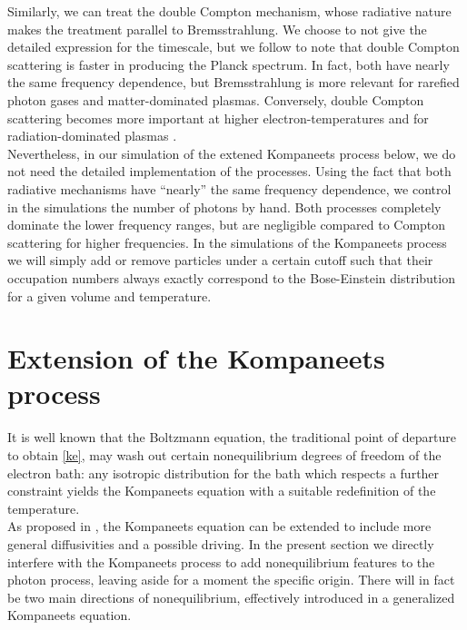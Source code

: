 \documentclass[a4paper,12pt,reqno,superscriptaddress,nofootinbib]{revtex4}
\newcommand{\0}{^{(0)}}
\newcommand{\1}{^{(1)}}
\newcommand{\2}{^{(2)}}
\begin{document}
Similarly, we can treat the double Compton mechanism, whose radiative nature makes the treatment parallel to Bremsstrahlung. We choose to not give the detailed expression for the timescale, but we follow \cite{lightman} to note that double Compton scattering is faster in producing the Planck spectrum. In fact, both have nearly the same frequency dependence, but Bremsstrahlung is more relevant for rarefied photon gases and matter-dominated plasmas. Conversely, double Compton scattering becomes more important at higher electron-temperatures and for radiation-dominated plasmas \cite{lightman}. \\

 Nevertheless, in our simulation of the extened Kompaneets process below, we do not need the detailed implementation of the 
processes.  Using the fact that both radiative mechanisms have 
``nearly'' the same frequency dependence, we control in the 
simulations the number of photons by hand.   Both processes completely 
dominate the lower frequency ranges, but are negligible compared to Compton 
scattering for higher frequencies. In the simulations of the Kompaneets process we will simply add or remove particles under a 
certain cutoff such that their occupation numbers always exactly correspond to 
the Bose-Einstein distribution for a given volume and temperature.


\section{Extension of the Kompaneets process}\label{extk-sec}

It is well known that the Boltzmann equation, the traditional point of departure to obtain \eqref{ke}, may wash out certain nonequilibrium degrees of freedom of the electron bath: any isotropic distribution \cite{barbosa,brown,brown2, peebles} for the bath which respects a further constraint \cite{paper} yields the Kompaneets equation with a suitable redefinition of the temperature.\\
As proposed in \cite{paper}, the Kompaneets equation can be extended to include more general diffusivities and a possible driving.   In the present section we directly interfere with the Kompaneets process to add nonequilibrium features to the photon process, leaving aside for a moment the specific origin.  There will in fact be two main directions of nonequilibrium, effectively introduced in a generalized Kompaneets equation.\\
\end{document}
